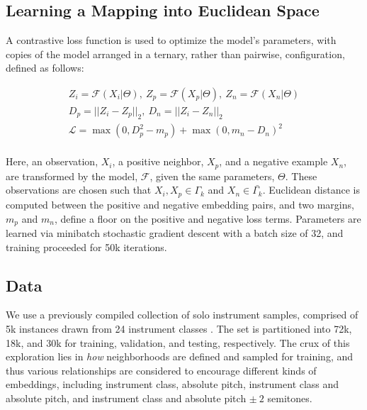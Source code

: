 \documentclass{article}
\begin{document}
\subsection{Learning a Mapping into Euclidean Space}

A contrastive loss function is used to optimize the model's parameters,
with copies of the model arranged in a ternary, rather than pairwise, configuration, defined as follows:

\begin{align*}
Z_i = \mathcal{F}(X_i | \Theta),~Z_p = \mathcal{F}(X_p | \Theta),~Z_n = \mathcal{F}(X_n | \Theta)\\
D_p = || Z_i - Z_p ||_2,~D_n = || Z_i - Z_n ||_2\\
\mathcal{L} = \max(0, D_p^2 - m_{p}) + \max(0, m_{n} - D_n)^2 \\
\end{align*}

Here, an observation, $X_i$, a positive neighbor, $X_p$, and a negative example $X_n$, are transformed by the model, $\mathcal{F}$, given the same parameters, $\Theta$.
These observations are chosen such that $X_i, X_p \in \Gamma_k$ and $X_n \in \bar{\Gamma_k}$.
Euclidean distance is computed between the positive and negative embedding pairs, and two margins, $m_p$ and $m_n$, define a floor on the positive and negative loss terms.
Parameters are learned via minibatch stochastic gradient descent with a batch size of 32, and training proceeded for 50k iterations.

\subsection{Data}

We use a previously compiled collection of solo instrument samples, comprised of 5k instances drawn from 24 instrument classes \cite{humphrey2015dl4mir}.
The set is partitioned into 72k, 18k, and 30k for training, validation, and testing, respectively.
The crux of this exploration lies in \emph{how} neighborhoods are defined and sampled for training, and thus various relationships are considered to encourage different kinds of embeddings, including instrument class, absolute pitch, instrument class and absolute pitch, and instrument class and absolute pitch $\pm~2$ semitones.
\end{document}
